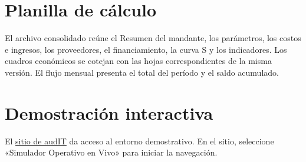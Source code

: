 \section{Planilla de cálculo}\label{sec:eco-planilla}

El archivo consolidado reúne el Resumen del mandante, los parámetros, los costos e ingresos, los proveedores, el financiamiento, la curva S y los indicadores. Los cuadros económicos se cotejan con las hojas correspondientes de la misma versión. El flujo mensual presenta el total del período y el saldo acumulado.

\section{Demostración interactiva}\label{sec:eco-demo}

El \href{https://carlosabarza.github.io/PaginaAudIT/#equipo}{sitio de audIT} da acceso al entorno demostrativo. En el sitio, seleccione «Simulador Operativo en Vivo» para iniciar la navegación.
